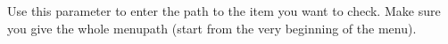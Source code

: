 
Use this parameter to enter the path to the item you want to check. Make sure you give the whole menupath (start from the very beginning of the menu).

